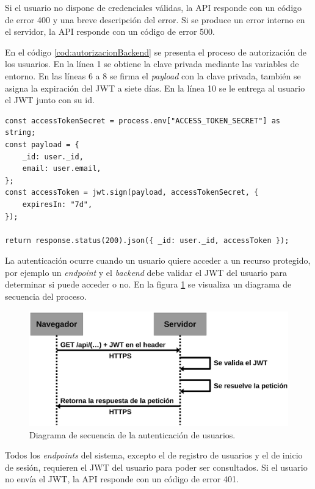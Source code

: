 Si el usuario no dispone de credenciales válidas, la API responde con un código de error 400 y una breve descripción del error. Si se produce un error interno en el servidor, la API responde con un código de error 500.

En el código \ref{cod:autorizacionBackend} se presenta el proceso de autorización de los usuarios. En la línea 1 se obtiene la clave privada mediante las variables de entorno. En las líneas 6 a 8 se firma el \emph{payload} con la clave privada, también se asigna la expiración del JWT a siete días. En la línea 10 se le entrega al usuario el JWT junto con su id.

\begin{lstlisting}[label=cod:autorizacionBackend,caption=Autorización de usuarios.]
const accessTokenSecret = process.env["ACCESS_TOKEN_SECRET"] as string;
const payload = {
    _id: user._id,
    email: user.email,
};
const accessToken = jwt.sign(payload, accessTokenSecret, {
    expiresIn: "7d",
});

return response.status(200).json({ _id: user._id, accessToken });
\end{lstlisting} 

La autenticación ocurre cuando un usuario quiere acceder a un recurso protegido, por ejemplo un \emph{endpoint} y el \emph{backend} debe validar el JWT del usuario para determinar si puede acceder o no. En la figura \ref{fig:diagramaSecuenciaAutenticacionUsuarios} se visualiza un diagrama de secuencia del proceso.

\begin{figure}[H]
	\centering
	\includegraphics[width=.9\textwidth]{./Figures/Diagrama de secuencia autenticacion de usuarios.png}
	\caption{Diagrama de secuencia de la autenticación de usuarios.}
	\label{fig:diagramaSecuenciaAutenticacionUsuarios}
\end{figure}

Todos los \textit{endpoints} del sistema, excepto el de registro de usuarios y el de inicio de sesión, requieren el JWT del usuario para poder ser consultados. Si el usuario no envía el JWT, la API responde con un código de error 401. 

